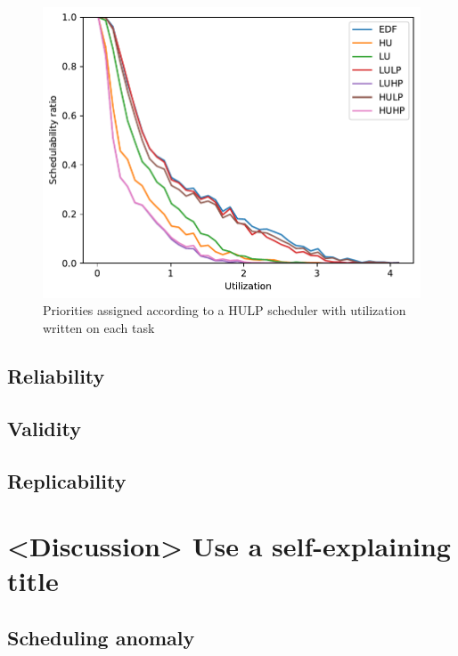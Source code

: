 \documentclass{kththesis}
\begin{document}
\begin{figure}

    \centering

    \includegraphics[width=1.0\linewidth]{images/sched_algos.pdf}

    \caption{Priorities assigned according to a HULP scheduler with utilization written on each task}

    \label{fig:sched_algos}

\end{figure}

\section{Reliability}

\section{Validity}

\section{Replicability}


\chapter{<Discussion> Use a self-explaining title}

\section{Scheduling anomaly}
\end{document}
